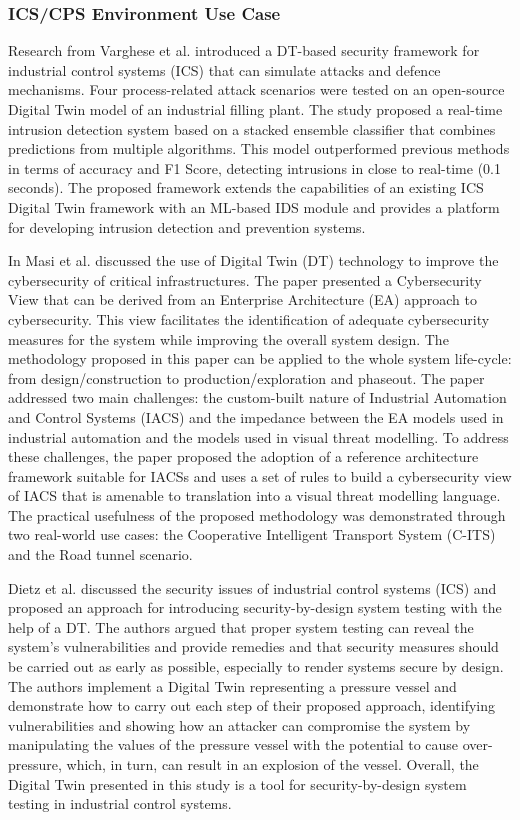 \subsubsection*{ICS/CPS Environment Use Case}

Research \cite{vargheseDigitalTwinbasedIntrusion2022} from Varghese et al. introduced a DT-based security framework for industrial control systems (ICS) that can simulate attacks and defence mechanisms. Four process-related attack scenarios were tested on an open-source Digital Twin model of an industrial filling plant. The study proposed a real-time intrusion detection system based on a stacked ensemble classifier that combines predictions from multiple algorithms. This model outperformed previous methods in terms of accuracy and F1 Score, detecting intrusions in close to real-time (0.1 seconds). The proposed framework extends the capabilities of an existing ICS Digital Twin framework with an ML-based IDS module and provides a platform for developing intrusion detection and prevention systems.


In\cite{masiSecuringCriticalInfrastructures2023} Masi et al. discussed the  use of Digital Twin (DT) technology to improve the cybersecurity of critical infrastructures. The paper presented a Cybersecurity View that can be derived from an Enterprise Architecture (EA) approach to cybersecurity. This view facilitates the identification of adequate cybersecurity measures for the system while improving the overall system design. The methodology proposed in this paper can be applied to the whole system life-cycle: from design/construction to production/exploration and phaseout. The paper addressed two main challenges: the custom-built nature of Industrial Automation and Control Systems (IACS) and the impedance between the EA models used in industrial automation and the models used in visual threat modelling. To address these challenges, the paper proposed the adoption of a reference architecture framework suitable for IACSs and uses a set of rules to build a cybersecurity view of IACS that is amenable to translation into a visual threat modelling language.  The practical usefulness of the proposed methodology was demonstrated through two real-world use cases: the Cooperative Intelligent Transport System (C-ITS) and the Road tunnel scenario. 

Dietz et al.\cite{dietzEmployingDigitalTwins2022} discussed the security issues of industrial control systems (ICS) and proposed an approach for introducing security-by-design system testing with the help of a DT. The authors argued that proper system testing can reveal the system’s vulnerabilities and provide remedies and that security measures should be carried out as early as possible, especially to render systems secure by design. The authors implement a Digital Twin representing a pressure vessel and demonstrate how to carry out each step of their proposed approach, identifying vulnerabilities and showing how an attacker can compromise the system by manipulating the values of the pressure vessel with the potential to cause over-pressure, which, in turn, can result in an explosion of the vessel. Overall, the Digital Twin presented in this study is a tool for security-by-design system testing in industrial control systems.


